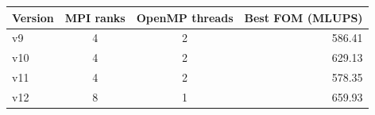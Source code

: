 \begin{tabular}{@{}lccr@{}}
\toprule
Version & MPI ranks & OpenMP threads & Best FOM (MLUPS) \\
\midrule
v9 & 4 & 2 & 586.41 \\
v10 & 4 & 2 & 629.13 \\
v11 & 4 & 2 & 578.35 \\
v12 & 8 & 1 & 659.93 \\
\bottomrule
\end{tabular}
